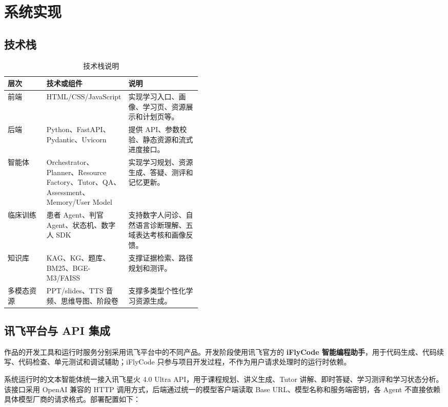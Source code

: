 \chapter{系统实现}
\label{sec:implementation}

\section{技术栈}

\begin{table}[H]
  \centering
  \caption{技术栈说明}
  \label{tab:tech-stack-implementation}
  \begin{tabularx}{\linewidth}{p{0.20\linewidth}p{0.24\linewidth}X}
    \toprule
    层次 & 技术或组件 & 说明 \\
    \midrule
    前端 & HTML/CSS/JavaScript & 实现学习入口、画像、学习页、资源展示和计划页等。 \\
    后端 & Python、FastAPI、Pydantic、Uvicorn & 提供 API、参数校验、静态资源和流式进度接口。 \\
    智能体 & Orchestrator、Planner、Resource Factory、Tutor、QA、Assessment、Memory/User Model & 实现学习规划、资源生成、答疑、测评和记忆更新。 \\
    临床训练 & 患者 Agent、判官 Agent、状态机、数字人 SDK & 支持数字人问诊、自然语言诊断理解、五域表达考核和画像反馈。 \\
    知识库 & KAG、KG、题库、BM25、BGE-M3/FAISS & 支撑证据检索、路径规划和测评。 \\
    多模态资源 & PPT/slides、TTS 音频、思维导图、阶段卷 & 支撑多类型个性化学习资源生成。 \\
    \bottomrule
  \end{tabularx}
\end{table}

\section{讯飞平台与 API 集成}

作品的开发工具和运行时服务分别采用讯飞平台中的不同产品。开发阶段使用讯飞官方的 \textbf{iFlyCode 智能编程助手}，用于代码生成、代码续写、代码检查、单元测试和调试辅助；iFlyCode 只参与项目开发过程，不作为用户请求处理时的运行时依赖。

系统运行时的文本智能体统一接入讯飞星火 4.0 Ultra API，用于课程规划、讲义生成、Tutor 讲解、即时答疑、学习测评和学习状态分析。该接口采用 OpenAI 兼容的 HTTP 调用方式，后端通过统一的模型客户端读取 Base URL、模型名称和服务端密钥，各 Agent 不直接依赖具体模型厂商的请求格式。部署配置如下：

